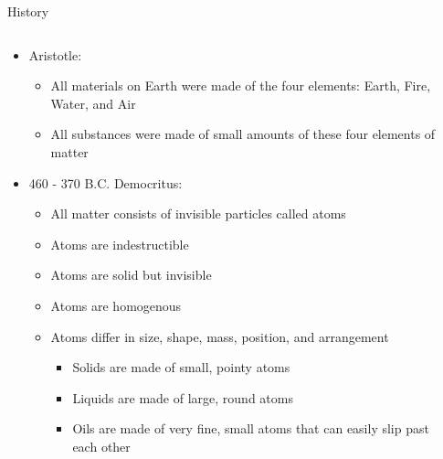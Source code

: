 \documentclass{beamer}
\begin{document}
{\begin{frame}{History}
    \begin{columns}
        \begin{column}{0.8\textwidth}
            \begin{itemize}
                \item Aristotle:
                \begin{itemize}
                    \item All materials on Earth were made of the four elements: Earth, Fire, Water, and Air
                    \item All substances were made of small amounts of these four elements of matter
                \end{itemize}
                \item 460 - 370 B.C. Democritus:
                \begin{itemize}
                    \item All matter consists of invisible particles called atoms
                    \item Atoms are indestructible
                    \item Atoms are solid but invisible
                    \item Atoms are homogenous
                    \item Atoms differ in size, shape, mass, position, and arrangement
                    \begin{itemize}
                        \item Solids are made of small, pointy atoms
                        \item Liquids are made of large, round atoms
                        \item Oils are made of very fine, small atoms that can easily slip past each other
                    \end{itemize}
                \end{itemize}
            \end{itemize}
        \end{column}
        \begin{column}{0.16\textwidth}

\end{column}
\end{columns}
\end{frame}}
\end{document}

